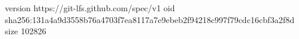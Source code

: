 version https://git-lfs.github.com/spec/v1
oid sha256:131a4a9d3558b76a4703f7ea8117a7e9ebeb2f94218c997f79cdc16cbf3a2f8d
size 102826
